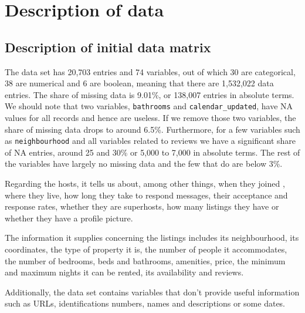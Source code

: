 


\section{Description of data}%
\label{sec:description_of_data}

\subsection{Description of initial data matrix}

The data set has 20,703 entries and 74 variables, out of which 30 are categorical,
38 are numerical and 6 are boolean, meaning that there are 1,532,022 data entries.
The share of missing data is 9.01\%, or 138,007
entries in absolute terms. We should note that two variables, \texttt{bathrooms} and
\texttt{calendar\_updated}, have NA values for all records and hence are useless.
If we remove those two variables, the share of missing data drops to
around 6.5\%.
Furthermore, for a few variables such as \texttt{neighbourhood} and all variables
related to reviews we have a significant share of NA entries, around 25 and 30\%
or 5,000 to 7,000 in absolute terms. The rest of the variables have largely no
missing data and the few that do are below 3\%.

Regarding the hosts, it tells us about, among other things, when they joined
\airbnb, where they live, how long they take to respond
messages, their acceptance and response rates, whether they are superhosts, how
many listings they have or whether they have a profile picture.

The information it supplies concerning the listings includes its
neighbourhood, its coordinates, the type of property it is, the number of people
it accommodates, the number of bedrooms, beds and bathrooms, amenities, price,
the minimum and maximum nights it can be rented, its availability and reviews.

Additionally, the data set contains variables that don't provide useful information
such as URLs, identifications numbers, names and descriptions or some dates.





